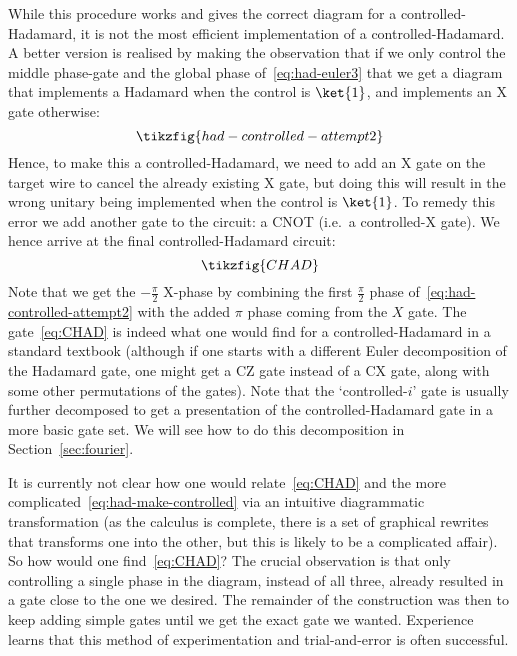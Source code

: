\documentclass[a4paper,onecolumn,superscriptaddress,11pt,%
				unpublished,%
				allowfontchageintitle,%
				]{quantumarticle}
\begin{document}
While this procedure works and gives the correct diagram for a controlled-Hadamard, it is not the most efficient implementation of a controlled-Hadamard. A better version is realised by making the observation that if we only control the middle phase-gate and the global phase of~\eqref{eq:had-euler3} that we get a diagram that implements a Hadamard when the control is $\ket{1}$, and implements an X gate otherwise:
\begin{equation}\label{eq:had-controlled-attempt2}
	\tikzfig{had-controlled-attempt2}
\end{equation}
Hence, to make this a controlled-Hadamard, we need to add an X gate on the target wire to cancel the already existing X gate, but doing this will result in the wrong unitary being implemented when the control is $\ket{1}$. To remedy this error we add another gate to the circuit: a CNOT (i.e.~a controlled-X gate). 
We hence arrive at the final controlled-Hadamard circuit:
\begin{equation}\label{eq:CHAD}
	\tikzfig{CHAD}
\end{equation}
Note that we get the $-\frac\pi2$ X-phase by combining the first $\frac\pi2$ phase of~\eqref{eq:had-controlled-attempt2} with the added $\pi$ phase coming from the $X$ gate.
The gate~\eqref{eq:CHAD} is indeed what one would find for a controlled-Hadamard in a standard textbook (although if one starts with a different Euler decomposition of the Hadamard gate, one might get a CZ gate instead of a CX gate, along with some other permutations of the gates). Note that the `controlled-$i$' gate is usually further decomposed to get a presentation of the controlled-Hadamard gate in a more basic gate set. We will see how to do this decomposition in Section~\ref{sec:fourier}.

It is currently not clear how one would relate~\eqref{eq:CHAD} and the more complicated~\eqref{eq:had-make-controlled} via an intuitive diagrammatic transformation (as the calculus is complete, there is a set of graphical rewrites that transforms one into the other, but this is likely to be a complicated affair).
So how would one find~\eqref{eq:CHAD}? The crucial observation is that only controlling a single phase in the diagram, instead of all three, already resulted in a gate close to the one we desired. The remainder of the construction was then to keep adding simple gates until we get the exact gate we wanted. Experience learns that this method of experimentation and trial-and-error is often successful.
\end{document}
